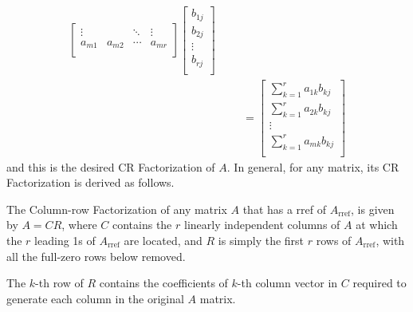 {\begin{align*}
\begin{bmatrix}
\vdots & & \ddots & \vdots \\
a_{m1} & a_{m2} & \cdots & a_{mr} \\
\end{bmatrix}
\begin{bmatrix}
b_{1j} \\
b_{2j} \\
\vdots \\
b_{rj} \\
\end{bmatrix} \\
& & &=
\begin{bmatrix}
\sum_{k=1}^r a_{1k}b_{kj} \\
\sum_{k=1}^r a_{2k}b_{kj} \\
\vdots \\
\sum_{k=1}^r a_{mk}b_{kj} \\
\end{bmatrix} 
\end{align*}} and this is the desired CR Factorization of $A$. In general, for any matrix, its CR Factorization is derived as follows.
\begin{proper}[CR Factorization]
\label{proper:CRFactor}
The Column-row Factorization of any matrix $A$ that has a rref of $A_{\text{rref}}$, is given by $A = CR$, where $C$ contains the $r$ linearly independent columns of $A$ at which the $r$ leading 1s of $A_{\text{rref}}$ are located, and $R$ is simply the first $r$ rows of $A_{\text{rref}}$, with all the full-zero rows below removed.
\end{proper}
The $k$-th row of $R$ contains the coefficients of $k$-th column vector in $C$ required to generate each column in the original $A$ matrix.

